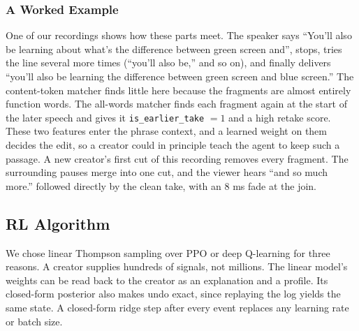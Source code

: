 \documentclass{ieeeaccess}
\begin{document}
\subsubsection{A Worked Example}
One of our recordings shows how these parts meet. The speaker says ``You'll also be learning about what's the difference between green screen and'', stops, tries the line several more times (``you'll also be,'' and so on), and finally delivers ``you'll also be learning the difference between green screen and blue screen.'' The content-token matcher finds little here because the fragments are almost entirely function words. The all-words matcher finds each fragment again at the start of the later speech and gives it \texttt{is\_earlier\_take} $=1$ and a high retake score. These two features enter the phrase context, and a learned weight on them decides the edit, so a creator could in principle teach the agent to keep such a passage. A new creator's first cut of this recording removes every fragment. The surrounding pauses merge into one cut, and the viewer hears ``and so much more.'' followed directly by the clean take, with an 8 ms fade at the join.

\subsection{RL Algorithm}
We chose linear Thompson sampling over PPO or deep Q-learning for three reasons. A creator supplies hundreds of signals, not millions. The linear model's weights can be read back to the creator as an explanation and a profile. Its closed-form posterior also makes undo exact, since replaying the log yields the same state. A closed-form ridge step after every event replaces any learning rate or batch size.
\end{document}

